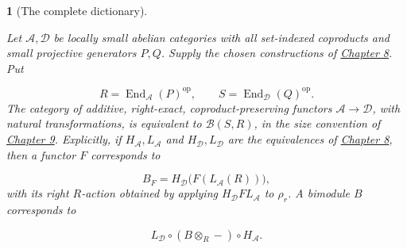 \documentclass[11pt,a4paper]{article}
\newcommand{\mathheading}{}
\theoremstyle{plain}
\newtheorem*{plainstatement}{\mathheading}
\theoremstyle{definition}
\newenvironment{mathstatement}[3]{\renewcommand{\mathheading}{#1 #2}\begin{plainstatement}[#3]}{\end{plainstatement}}
\begin{document}
\begin{mathstatement}{Theorem}{10.4}{The complete dictionary}
\label{env-10-4}

Let \(\mathcal A,\mathcal D\) be locally small abelian categories with all set-indexed coproducts and small projective generators \(P,Q\). Supply the chosen constructions of \hyperref[chapter-08]{Chapter 8}. Put

 \[R=\operatorname{End}_{\mathcal A}(P)^{\mathrm{op}},\qquad S=\operatorname{End}_{\mathcal D}(Q)^{\mathrm{op}}.\] 
The category of additive, right-exact, coproduct-preserving functors \(\mathcal A\to\mathcal D\), with natural transformations, is equivalent to \(\mathscr B(S,R)\), in the size convention of \hyperref[chapter-09]{Chapter 9}. Explicitly, if \(H_{\mathcal A},L_{\mathcal A}\) and \(H_{\mathcal D},L_{\mathcal D}\) are the equivalences of \hyperref[chapter-08]{Chapter 8}, then a functor \(F\) corresponds to

 \[B_F=H_{\mathcal D}\bigl(F(L_{\mathcal A}(R))\bigr),\] 
with its right \(R\)-action obtained by applying \(H_{\mathcal D}F L_{\mathcal A}\) to \(\rho_r\). A bimodule \(B\) corresponds to

 \[L_{\mathcal D}\circ(B\otimes_R-)\circ H_{\mathcal A}.\]
\par{}\par

\end{mathstatement}
 
\end{document}
